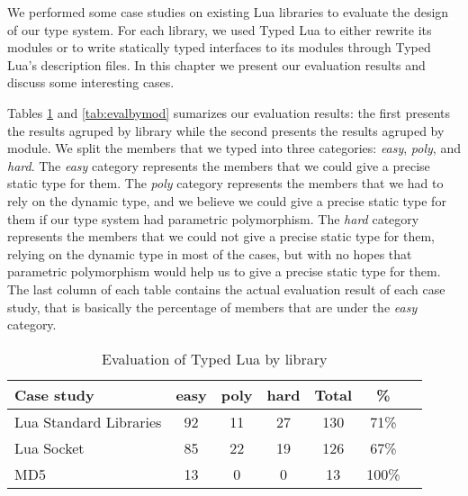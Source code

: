 We performed some case studies on existing Lua libraries
to evaluate the design of our type system.
For each library, we used Typed Lua to either rewrite its modules
or to write statically typed interfaces to its modules through
Typed Lua's description files.
In this chapter we present our evaluation results and discuss
some interesting cases.

Tables \ref{tab:evalbylib} and \ref{tab:evalbymod} sumarizes our
evaluation results:
the first presents the results agruped by library while
the second presents the results agruped by module.
We split the members that we typed into three categories:
\emph{easy}, \emph{poly}, and \emph{hard}.
The \emph{easy} category represents the members that we could give
a precise static type for them.
The \emph{poly} category represents the members that we had to
rely on the dynamic type, and we believe we could give a precise
static type for them if our type system had parametric polymorphism.
The \emph{hard} category represents the members that we could not
give a precise static type for them, relying on the dynamic type
in most of the cases, but with no hopes that parametric polymorphism
would help us to give a precise static type for them.
The last column of each table contains the actual evaluation result
of each case study, that is basically the percentage of members
that are under the \emph{easy} category.

\begin{table}[!ht]
\begin{center}
\begin{tabular}{|l|c|c|c|c|c|c|}
\hline
\textbf{Case study} & \textbf{easy} & \textbf{poly} & \textbf{hard} & \textbf{Total} & \textbf{\%} \\
\hline
Lua Standard Libraries & 92 & 11 & 27 & 130 & 71\% \\
\hline
Lua Socket & 85 & 22 & 19 & 126 & 67\% \\
\hline
MD5 & 13 & 0 & 0 & 13 & 100\% \\
\hline
\end{tabular}
\end{center}
\caption{Evaluation of Typed Lua by library}
\label{tab:evalbylib}
\end{table}

